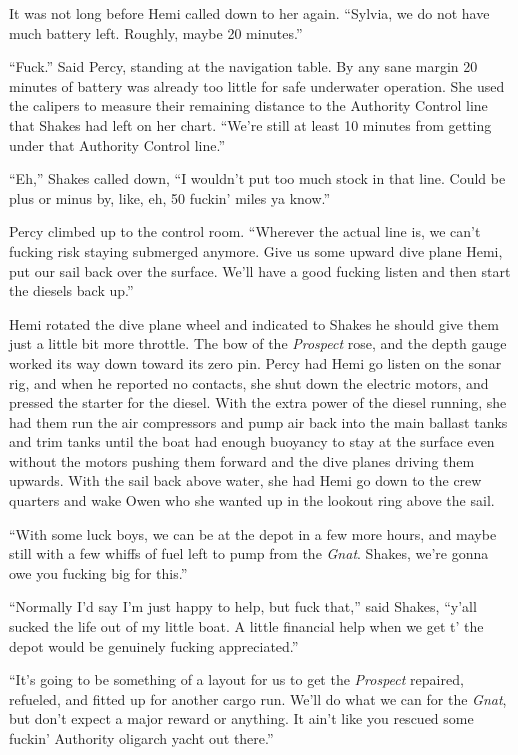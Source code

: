 \documentclass[
]{scrbook}
\begin{document}
It was not long before Hemi called down to her again. ``Sylvia, we do
not have much battery left. Roughly, maybe 20 minutes.''

``Fuck.'' Said Percy, standing at the navigation table. By any sane
margin 20 minutes of battery was already too little for safe underwater
operation. She used the calipers to measure their remaining distance to
the Authority Control line that Shakes had left on her chart. ``We're
still at least 10 minutes from getting under that Authority Control
line.''

``Eh,'' Shakes called down, ``I wouldn't put too much stock in that
line. Could be plus or minus by, like, eh, 50 fuckin' miles ya know.''

Percy climbed up to the control room. ``Wherever the actual line is, we
can't fucking risk staying submerged anymore. Give us some upward dive
plane Hemi, put our sail back over the surface. We'll have a good
fucking listen and then start the diesels back up.''

Hemi rotated the dive plane wheel and indicated to Shakes he should give
them just a little bit more throttle. The bow of the \emph{Prospect}
rose, and the depth gauge worked its way down toward its zero pin. Percy
had Hemi go listen on the sonar rig, and when he reported no contacts,
she shut down the electric motors, and pressed the starter for the
diesel. With the extra power of the diesel running, she had them run the
air compressors and pump air back into the main ballast tanks and trim
tanks until the boat had enough buoyancy to stay at the surface even
without the motors pushing them forward and the dive planes driving them
upwards. With the sail back above water, she had Hemi go down to the
crew quarters and wake Owen who she wanted up in the lookout ring above
the sail.

``With some luck boys, we can be at the depot in a few more hours, and
maybe still with a few whiffs of fuel left to pump from the \emph{Gnat}.
Shakes, we're gonna owe you fucking big for this.''

``Normally I'd say I'm just happy to help, but fuck that,'' said Shakes,
``y'all sucked the life out of my little boat. A little financial help
when we get t' the depot would be genuinely fucking appreciated.''

``It's going to be something of a layout for us to get the
\emph{Prospect} repaired, refueled, and fitted up for another cargo run.
We'll do what we can for the \emph{Gnat}, but don't expect a major
reward or anything. It ain't like you rescued some fuckin' Authority
oligarch yacht out there.''
\end{document}
